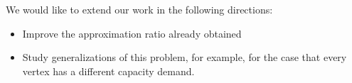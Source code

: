 We would like to extend our work in the following directions:

\begin{itemize}

\item
Improve the approximation ratio already obtained

\item
Study generalizations of this problem, for example, 
for the case that every vertex has a different capacity demand.

\end{itemize}
